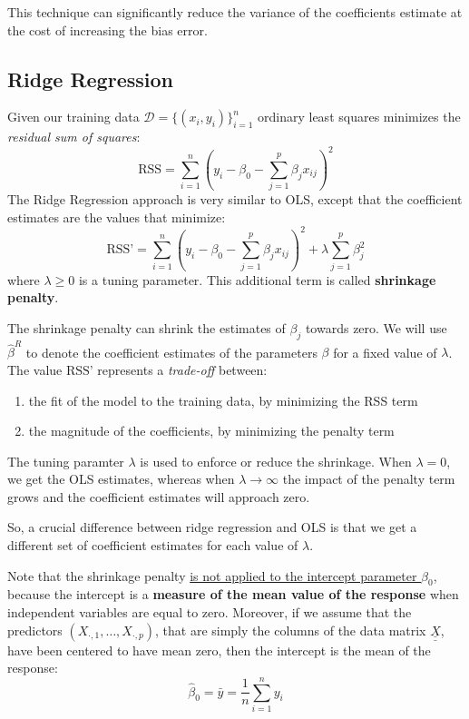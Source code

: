 This technique can significantly reduce the variance of the coefficients estimate at the cost of increasing the bias error.

\subsection{Ridge Regression}
Given our training data $\mathcal{D} = \{(x_i, y_i)\}_{i=1}^n $ ordinary least squares minimizes the \textit{residual sum of squares}:
\[
    \text{RSS} = \sum_{i=1}^{n} \left(y_i - \beta_0 - \sum_{j=1}^{p} \beta_j x_{ij}\right)^2
\]
The Ridge Regression approach is very similar to OLS, except that the coefficient estimates are the values that minimize:
\[
    \text{RSS'} = \sum_{i=1}^{n} \left(y_i - \beta_0 - \sum_{j=1}^{p} \beta_j x_{ij}\right)^2 + \lambda \sum_{j=1}^{p} \beta_j^2
\]
where $\lambda\ge 0$ is a tuning parameter. This additional term is called \textbf{shrinkage penalty}.

The shrinkage penalty can shrink the estimates of $\beta_j$ towards zero. We will use $\hat{\beta}^R$ to denote the coefficient estimates of the parameters $\beta$ for a fixed value of $\lambda$.
The value $\text{RSS'}$ represents a \textit{trade-off} between:
\begin{enumerate}
    \item the fit of the model to the training data, by minimizing the RSS term
    \item the magnitude of the coefficients, by minimizing the penalty term
\end{enumerate}

The tuning paramter $\lambda$ is used to enforce or reduce the shrinkage.
When $\lambda = 0$, we get the OLS estimates, whereas when $\lambda \to \infty$ the impact of the penalty term grows and the coefficient estimates will approach zero.

So, a crucial difference between ridge regression and OLS is that we get a different set of coefficient estimates for each value of $\lambda$.

Note that the shrinkage penalty \underline{is not applied to the intercept parameter $\beta_0$}, because the intercept is a \textbf{measure of the mean value of the response} when independent variables are equal to zero. 
Moreover, if we assume that the predictors $(X_{\cdot, 1}, \dots, X_{\cdot, p})$, that are simply the columns of the data matrix $\underline{\underline X}$, have been centered to have mean zero, then the intercept is the mean of the response:
\[
    \hat{\beta}_0 = \bar{y} = \frac{1}{n} \sum_{i=1}^{n} y_i
\]

